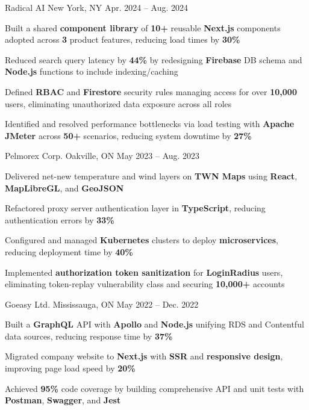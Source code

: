 \documentclass[11pt, a4paper]{awesome-cv}
\begin{document}
\begin{cventries}
  \cventry
    {\color{lightblue}{SOFTWARE ENGINEER INTERN}}
    {Radical AI}
    {New York, NY}
    {Apr. 2024 -- Aug. 2024}
    {
      \begin{cvitems}
        \item{Built a shared \textbf{component library} of \textbf{10+} reusable \textbf{Next.js} components adopted across \textbf{3} product features, reducing load times by \textbf{30\%}}
        \item{Reduced search query latency by \textbf{44\%} by redesigning \textbf{Firebase} DB schema and \textbf{Node.js} functions to include indexing/caching}
        \item{Defined \textbf{RBAC} and \textbf{Firestore} security rules managing access for over \textbf{10,000} users, eliminating unauthorized data exposure across all roles}
        \item{Identified and resolved performance bottlenecks via load testing with \textbf{Apache JMeter} across \textbf{50+} scenarios, reducing system downtime by \textbf{27\%}}
      \end{cvitems}
    }

  \cventry
    {\color{lightblue}{SOFTWARE ENGINEER INTERN}}
    {Pelmorex Corp.}
    {Oakville, ON}
    {May 2023 -- Aug. 2023}
    {
      \begin{cvitems}
        \item{Delivered net-new temperature and wind layers on \textbf{TWN Maps} using \textbf{React}, \textbf{MapLibreGL}, and \textbf{GeoJSON}}
        \item{Refactored proxy server authentication layer in \textbf{TypeScript}, reducing authentication errors by \textbf{33\%}}
        \item{Configured and managed \textbf{Kubernetes} clusters to deploy \textbf{microservices}, reducing deployment time by \textbf{40\%}}
        \item{Implemented \textbf{authorization token sanitization} for \textbf{LoginRadius} users, eliminating token-replay vulnerability class and securing \textbf{10,000+} accounts}
      \end{cvitems}
    }

  \cventry
    {\color{lightblue}{FRONT-END DEVELOPER INTERN}}
    {Goeasy Ltd.}
    {Mississauga, ON}
    {May 2022 -- Dec. 2022}
    {
      \begin{cvitems}
        \item{Built a \textbf{GraphQL} API with \textbf{Apollo} and \textbf{Node.js} unifying RDS and Contentful data sources, reducing response time by \textbf{37\%}}
        \item{Migrated company website to \textbf{Next.js} with \textbf{SSR} and \textbf{responsive design}, improving page load speed by \textbf{20\%}}
        \item{Achieved \textbf{95\%} code coverage by building comprehensive API and unit tests with \textbf{Postman}, \textbf{Swagger}, and \textbf{Jest}}
      \end{cvitems}
    }

\end{cventries}
\end{document}
